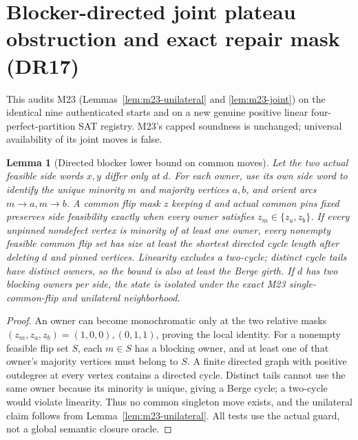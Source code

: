 \documentclass[11pt]{article}
\newtheorem{lemma}[theorem]{Lemma}
\begin{document}
\section{Blocker-directed joint plateau obstruction and exact repair mask (DR17)}\label{sec:dr17}
This audits M23 (Lemmas~\ref{lem:m23-unilateral} and \ref{lem:m23-joint}) on the identical nine authenticated starts and on a new genuine positive linear four-perfect-partition SAT registry. M23's capped soundness is unchanged; universal availability of its joint moves is false.

\begin{lemma}[Directed blocker lower bound on common moves]\label{lem:dr17-cycle}
Let the two actual feasible side words $x,y$ differ only at $d$. For each owner, use its own side word to identify the unique minority $m$ and majority vertices $a,b$, and orient arcs $m\to a,m\to b$. A common flip mask $z$ keeping $d$ and actual common pins fixed preserves side feasibility exactly when every owner satisfies $z_m\in\{z_a,z_b\}$. If every unpinned nondefect vertex is minority of at least one owner, every nonempty feasible common flip set has size at least the shortest directed cycle length after deleting $d$ and pinned vertices. Linearity excludes a two-cycle; distinct cycle tails have distinct owners, so the bound is also at least the Berge girth. If $d$ has two blocking owners per side, the state is isolated under the exact M23 single-common-flip and unilateral neighborhood.
\end{lemma}
\begin{proof}
An owner can become monochromatic only at the two relative masks $(z_m,z_a,z_b)=(1,0,0),(0,1,1)$, proving the local identity. For a nonempty feasible flip set $S$, each $m\in S$ has a blocking owner, and at least one of that owner's majority vertices must belong to $S$. A finite directed graph with positive outdegree at every vertex contains a directed cycle. Distinct tails cannot use the same owner because its minority is unique, giving a Berge cycle; a two-cycle would violate linearity. Thus no common singleton move exists, and the unilateral claim follows from Lemma~\ref{lem:m23-unilateral}. All tests use the actual guard, not a global semantic closure oracle.
\end{proof}
\end{document}
